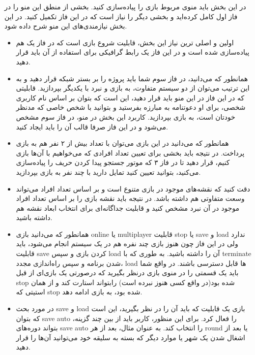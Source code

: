 \documentclass[]{article}
\begin{document}
  در این بخش باید منوی مربوط بازی را پیاده‌سازی کنید. بخشی از منطق این منو را در فاز اول کامل کرده‌اید و بخشی دیگر را نیاز است که در این فاز تکمیل کنید. در این بخش نیازمندی‌های این منو شرح داده شود.

\begin{itemize}
\item اولین و اصلی ترین نیاز این بخش، قابلیت شروع بازی است که در فاز یک هم پیاده‌سازی شده است و در این فاز یک رابط گرافیکی برای استفاده از آن باید قرار دهید.

\item همانطور که می‌دانید، در فاز سوم شما باید پروژه را بر بستر شبکه قرار دهید و به این ترتیب می‌توان از دو سیستم متفاوت، به بازی و نبرد با یکدیگر بپردازید. قابلیتی که در این فاز در این منو باید قرار دهید، این است که بتوان بر اساس نام کاربری شخصی، برای او دعوتنامه به مبارزه بفرستید و بتوانید با شخص خاصی که مدنظر خودتان است، به بازی بپردازید. کاربرد این بخش در منو، در فاز سوم مشخص می‌شود و در این فاز صرفا قالب آن را باید ایجاد کنید.

\item همانطور که می‌دانید در این بازی می‌توان با تعداد بیش از ۲ نفر هم به بازی پرداخت. در نتیجه باید بخشی برای تعیین تعداد افرادی که می‌خواهیم با آن‌ها بازی کنیم، قرار دهید تا در فاز ۳ که موتور جستجو پیدا کردن حریف را پیاده‌سازی می‌کنید، بتوانید تعیین کنید تمایل دارید با چند نفر به بازی بپردازید.

\item دقت کنید که نقشه‌های موجود در بازی متنوع است و بر اساس تعداد افراد می‌تواند وسعت متفاوتی هم داشته باشد. در نتیجه باید نقشه بازی را بر اساس تعداد افراد موجود در آن نبرد مشخص کنید و قابلیت جداگانه‌ای برای انتخاب ابعاد نقشه هم داشته باشید.

\item همانطور که می‌دانید بازی online یا multiplayer قابلیت stop یا save و load ندارد ولی در این فاز چون هنوز بازی چند نفره هم در یک سیستم انجام می‌شود، باید قابلیت save کردن بازی و سپس load آن را داشته باشید. به طوری که با terminate شدن برنامه و سپس راه‌اندازی مجدد، load ها قابل دسترسی باشند.
در واقع شما باید یک قسمتی را در منوی بازی درنظر بگیرید که درصورتی یک بازی‌ای از قبل stop شده بود(در واقع کسی هنوز نبرده است) رابتواند استارت کند و از همان استیتی که stop شده بود، به بازی ادامه دهد.
\item در مورد بحث save و load بازی یک قابلیت که باید آن را در نظر بگیرید، این است که بتوان save auto را فعال کرد. برای این منظور، کاربر باید از بین چند گزینه، بتواند دوره‌های save auto را انتخاب کند. به عنوان مثال، بعد از هر round یا بعد از اشغال شدن یک شهر یا موارد دیگر که بسته به سلیقه خود می‌توانید آن‌ها را قرار دهید.


\end{itemize}
\end{document}
